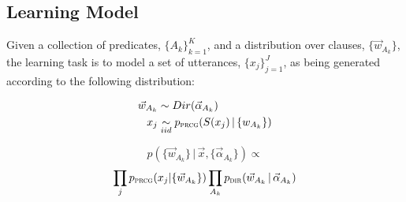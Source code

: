 \documentclass[10pt, twocolumn]{article}
\begin{document}




\subsection{Learning Model}

Given a collection of predicates, $\{A_k\}_{k=1}^{K}$, and a
distribution over clauses, $\{\vec{w}_{A_k}\}$, the learning task is
to model a set of utterances, $\{x_j\}_{j=1}^{J}$, as being generated
according to the following distribution:

\begin{align*}
  \vec{w}_{A_k} &\sim Dir(\vec{\alpha}_{A_k})\\
  x_j &\underset{iid}{\sim} p_{\text{\textsc{prcg}}}(S(x_j)\,|\,\{w_{A_k}\})
\end{align*}

\[ p(\{\vec{w}_{A_k}\}\,|\, \vec{x}, \{\vec{\alpha}_{A_k}\}) \propto\]\[ \prod_j
p_{\text{\textsc{prcg}}}(x_j|\{\vec{w}_{A_k}\}) \prod_{A_k} p_{\text{\textsc{dir}}}(\vec{w}_{A_k}\,|\,\vec{\alpha}_{A_k}) \]
\end{document}
